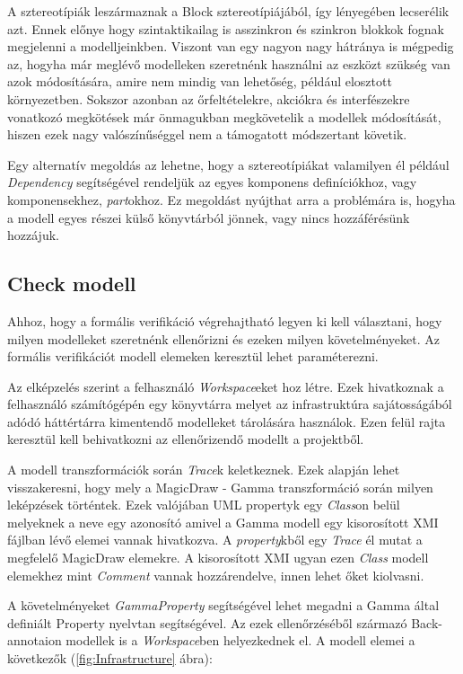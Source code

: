 A sztereotípiák leszármaznak a Block sztereotípiájából, így lényegében lecserélik azt. Ennek előnye hogy szintaktikailag is asszinkron és szinkron blokkok fognak megjelenni a modelljeinkben. Viszont van egy nagyon nagy hátránya is mégpedig az, hogyha már meglévő modelleken szeretnénk használni az eszközt szükség van azok módosítására, amire nem mindig van lehetőség, például elosztott környezetben. Sokszor azonban az őrfeltételekre, akciókra és interfészekre vonatkozó megkötések már önmagukban megkövetelik a modellek módosítását, hiszen ezek nagy valószínűséggel nem a támogatott módszertant követik.

Egy alternatív megoldás az lehetne, hogy a sztereotípiákat valamilyen él például \emph{Dependency} segítségével rendeljük az egyes komponens definíciókhoz, vagy komponensekhez, \emph{part}okhoz. Ez megoldást nyújthat arra a problémára is, hogyha a modell egyes részei külső könyvtárból jönnek, vagy nincs hozzáférésünk hozzájuk.


\subsection{Check modell}

Ahhoz, hogy a formális verifikáció végrehajtható legyen ki kell választani, hogy milyen modelleket szeretnénk ellenőrizni és ezeken milyen követelményeket. Az formális verifikációt modell elemeken keresztül lehet paraméterezni.

Az elképzelés szerint a felhasználó \emph{Workspace}eket hoz létre. Ezek hivatkoznak a felhasználó számítógépén egy könyvtárra melyet az infrastruktúra sajátosságából adódó háttértárra kimentendő modelleket tárolására használok. Ezen felül rajta keresztül kell behivatkozni az ellenőrizendő modellt a projektből.

A modell transzformációk során \emph{Trace}k keletkeznek. Ezek alapján lehet visszakeresni, hogy mely a MagicDraw - Gamma transzformáció során milyen leképzések történtek. Ezek valójában UML propertyk egy \emph{Class}on belül melyeknek a neve egy azonosító amivel a Gamma modell egy kisorosított XMI fájlban lévő elemei vannak hivatkozva. A \emph{property}kből egy \emph{Trace} él mutat a megfelelő MagicDraw elemekre. A kisorosított XMI ugyan ezen \emph{Class} modell elemekhez mint \emph{Comment} vannak hozzárendelve, innen lehet őket kiolvasni.

A követelményeket \emph{GammaProperty} segítségével lehet megadni a Gamma által definiált Property nyelvtan segítségével. Az ezek ellenőrzéséből származó Back-annotaion modellek is a \emph{Workspace}ben helyezkednek el. A modell elemei a következők (\ref{fig:Infrastructure} ábra):

